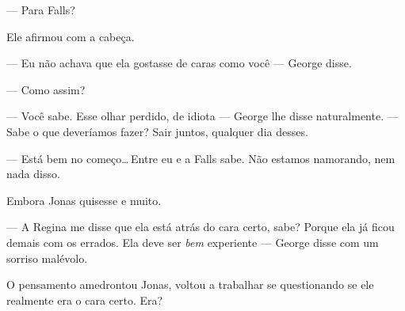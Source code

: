  --- Para Falls?

 Ele afirmou com a cabeça.

 --- Eu não achava que ela gostasse de caras como você --- George disse.

 --- Como assim?

 --- Você sabe. Esse olhar perdido, de idiota --- George lhe disse naturalmente. ---  Sabe o que deveríamos fazer? Sair juntos, qualquer dia desses.

 --- Está bem no começo\ldots\,Entre eu e a Falls sabe. Não estamos namorando, nem nada disso.

 Embora Jonas quisesse e muito.

 --- A Regina me disse que ela está atrás do cara certo, sabe? Porque ela já ficou demais com os errados. Ela deve ser \emph{bem} experiente --- George disse\mudanca{,} com um sorriso malévolo.

 O pensamento amedrontou Jonas,  voltou a trabalhar\mudanca{,} se questionando se ele realmente era o cara certo. Era?
